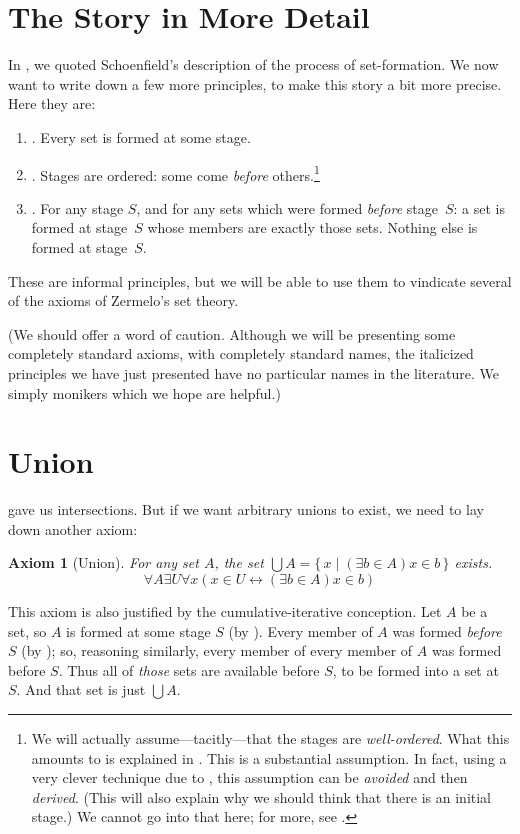 \documentclass[10pt,a4paper]{article}
\makeatletter
\theoremstyle{plain}
\newtheorem{axiom}{Axiom}
\theoremstyle{definition}
\theoremstyle{remark}
\newcommand*{\olfileid}[3]{}
\newcommand*{\olsection}[1]{\section*{#1}}
\newcommand{\olref}{\@ifnextchar[{\olref@i}{\olref@final}}
\def\olref@i[#1]{\@ifnextchar[{\olref@ii}{\olref@final}}
\def\olref@ii[#1]{\@ifnextchar[{\olref@iii}{\olref@final}}
\def\olref@iii[#1]{\olref@final}
\def\olref@final#1{\ref{#1}}
\providecommand{\Setabs}[2]{\{\, #1 \mid #2 \,\}}
\providecommand{\liff}{\mathbin{\leftrightarrow}}
\providecommand{\citet}[1]{\cite{#1}}
\makeatother
\begin{document}


\olfileid{sth}{z}{story}
\olsection{The Story in More Detail}
	
In \olref[story][approach]{sec}, we quoted Schoenfield's
description of the process of set-formation. We now want to write down
a few more principles, to make this story a bit more precise. Here
they are:
\begin{enumerate}
\item[] \stageshier. Every set is formed at some stage.
\item[] \stagesord. Stages are ordered: some come \emph{before}
others.\footnote{We will actually assume---tacitly---that the stages
are \emph{well-ordered}. What this amounts to is explained in
\olref[ordinals][]{chap}. This is a substantial assumption. In fact,
using a very clever technique due to \citet{Scott1974}, this
assumption can be \emph{avoided} and then \emph{derived}. (This will
also explain why we should think that there is an initial stage.) We cannot go into that here; for more, see \citet{ButtonLT1}.} 
\item[] \stagesacc. For any stage $S$, and for any sets which were
formed \emph{before} stage~$S$: a set is formed at stage~$S$ whose
members are exactly those sets. Nothing else is formed at stage~$S$.
\end{enumerate}
These are informal principles, but we will be able to use them to
vindicate several of the axioms of Zermelo's set theory. 

(We should offer a word of caution. Although we will be presenting some
completely standard axioms, with completely standard names, the
italicized principles we have just presented have no particular names
in the literature. We simply monikers which we hope are helpful.)



\olfileid{sth}{z}{union}
\olsection{Union}

\olref[sth][z][sep]{prop:intersectionsexist} gave us intersections.
But if we want arbitrary unions to exist, we need to lay down another
axiom:

\begin{axiom}[Union] For any set $A$, the set $\bigcup A =
\Setabs{x}{(\exists b \in A) x \in b}$ exists.
\[
	\forall A \exists U \forall x(x \in U \liff (\exists b \in A)x \in b)
\]
\end{axiom}

This axiom is also justified by the cumulative-iterative conception.
Let $A$ be a set, so $A$ is formed at some stage $S$ (by \stageshier).
Every member of $A$ was formed \emph{before}  $S$ (by \stagesacc); so,
reasoning similarly, every member of every member of $A$ was formed
before $S$. Thus all of \emph{those} sets are available before $S$, to
be formed into a set at $S$. And that set is just $\bigcup A$.
\end{document}
